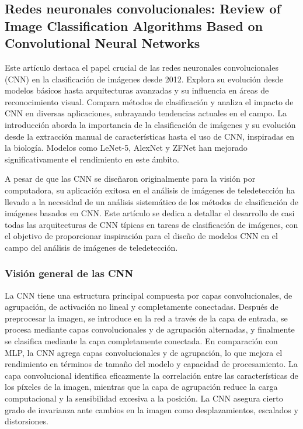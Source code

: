  \subsection{Redes neuronales convolucionales: Review of Image Classification Algorithms Based on Convolutional Neural Networks \citep*{tecnica2}}
 Este artículo destaca el papel crucial de las redes neuronales convolucionales (CNN) en la clasificación de imágenes desde 2012. Explora su evolución desde modelos básicos hasta arquitecturas avanzadas y su influencia en áreas de reconocimiento visual. Compara métodos de clasificación y analiza el impacto de CNN en diversas aplicaciones, subrayando tendencias actuales en el campo. La introducción aborda la importancia de la clasificación de imágenes y su evolución desde la extracción manual de características hasta el uso de CNN, inspiradas en la biología. Modelos como LeNet-5, AlexNet y ZFNet han mejorado significativamente el rendimiento en este ámbito.
 
 A pesar de que las CNN se diseñaron originalmente para la visión por computadora, su aplicación exitosa en el análisis de imágenes de teledetección ha llevado a la necesidad de un análisis sistemático de los métodos de clasificación de imágenes basados en CNN. Este artículo se dedica a detallar el desarrollo de casi todas las arquitecturas de CNN típicas en tareas de clasificación de imágenes, con el objetivo de proporcionar inspiración para el diseño de modelos CNN en el campo del análisis de imágenes de teledetección.
 
 
 \subsubsection{Visión general de las CNN}
 La CNN tiene una estructura principal compuesta por capas convolucionales, de agrupación, de activación no lineal y completamente conectadas. Después de preprocesar la imagen, se introduce en la red a través de la capa de entrada, se procesa mediante capas convolucionales y de agrupación alternadas, y finalmente se clasifica mediante la capa completamente conectada. En comparación con MLP, la CNN agrega capas convolucionales y de agrupación, lo que mejora el rendimiento en términos de tamaño del modelo y capacidad de procesamiento. La capa convolucional identifica eficazmente la correlación entre las características de los píxeles de la imagen, mientras que la capa de agrupación reduce la carga computacional y la sensibilidad excesiva a la posición. La CNN asegura cierto grado de invarianza ante cambios en la imagen como desplazamientos, escalados y distorsiones.
 
